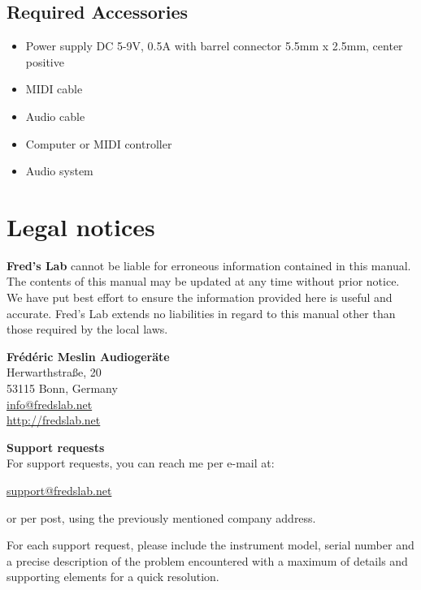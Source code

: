 \documentclass{scrartcl}
\begin{document}
\subsection{Required Accessories}

\begin{itemize}
    \item Power supply DC 5-9V, 0.5A with barrel connector 5.5mm x 2.5mm, center positive
    \item MIDI cable
    \item Audio cable
    \item Computer or MIDI controller
    \item Audio system
\end{itemize}


\section{Legal notices}

\textbf{Fred's Lab} cannot be liable for erroneous information contained in this manual. The contents of this manual may be updated at any time without prior notice. We have put best effort to ensure the information provided here is useful and accurate. Fred's Lab extends no liabilities in regard to this manual other than those required by the local laws.

\begin{center}
    \textbf{Frédéric Meslin Audiogeräte} \\
    Herwarthstraße, 20 \\
    53115 Bonn, Germany \\
    \url{info@fredslab.net} \\
    \url{http://fredslab.net} \\
\end{center}

\textbf{Support requests} \\
For support requests, you can reach me per e-mail at:
\begin{center}
    \url{support@fredslab.net}
\end{center}
or per post, using the previously mentioned company address.

For each support request, please include the instrument model, serial number and a precise description of the problem encountered with a maximum of details and supporting elements for a quick resolution.
\end{document}
